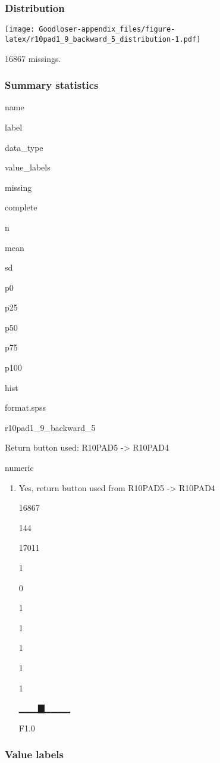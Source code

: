 \documentclass[]{book}
\providecommand{\tightlist}{%
  \setlength{\itemsep}{0pt}\setlength{\parskip}{0pt}}
\begin{document}
\subsubsection{Distribution}\label{r10pad1_9_backward_5_distribution}

\texttt{[image: Goodloser-appendix\_files/figure-latex/r10pad1\_9\_backward\_5\_distribution-1.pdf]}

16867 missings.

\subsubsection{Summary statistics}\label{r10pad1_9_backward_5_summary}

name

label

data\_type

value\_labels

missing

complete

n

mean

sd

p0

p25

p50

p75

p100

hist

format.spss

r10pad1\_9\_backward\_5

Return button used: R10PAD5 -\textgreater{} R10PAD4

numeric

\begin{enumerate}
\def\labelenumi{\arabic{enumi}.}
\tightlist
\item
  Yes, return button used from R10PAD5 -\textgreater{} R10PAD4

  16867

  144

  17011

  1

  0

  1

  1

  1

  1

  1

  ▁▁▁▇▁▁▁▁

  F1.0
\end{enumerate}

\subsubsection{Value labels}\label{r10pad1_9_backward_5_labels}
\end{document}
